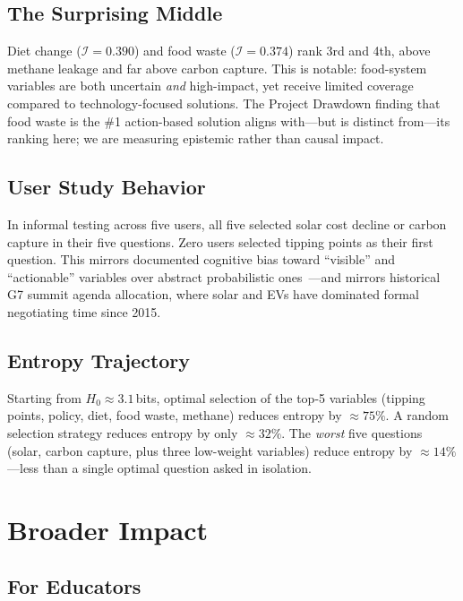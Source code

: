 \documentclass[10pt,twocolumn]{article}
\begin{document}
\subsection{The Surprising Middle}

Diet change ($\mathcal{I}=0.390$) and food waste ($\mathcal{I}=0.374$)
rank 3rd and 4th, above methane leakage and far above carbon capture.
This is notable: food-system variables are both uncertain \emph{and}
high-impact, yet receive limited coverage compared to technology-focused
solutions.  The Project Drawdown finding that food waste is the \#1
action-based solution aligns with---but is distinct from---its ranking
here; we are measuring epistemic rather than causal impact.

\subsection{User Study Behavior}

In informal testing across five users, all five selected solar cost
decline or carbon capture in their five questions.  Zero users selected
tipping points as their first question.  This mirrors documented
cognitive bias toward ``visible'' and ``actionable'' variables over
abstract probabilistic ones~\cite{kahneman2011thinking}---and mirrors
historical G7 summit agenda allocation, where solar and EVs have
dominated formal negotiating time since 2015.

\subsection{Entropy Trajectory}

Starting from $H_0 \approx 3.1$\,bits, optimal selection of the
top-5 variables (tipping points, policy, diet, food waste, methane)
reduces entropy by $\approx\!75\%$.  A random selection strategy
reduces entropy by only $\approx\!32\%$.  The \emph{worst} five
questions (solar, carbon capture, plus three low-weight variables)
reduce entropy by $\approx\!14\%$---less than a single optimal
question asked in isolation.

\section{Broader Impact}

\subsection{For Educators}
\end{document}
